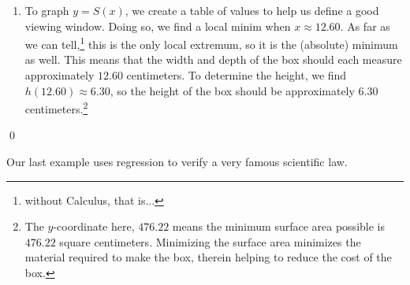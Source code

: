 \documentclass{ximera}
\begin{document}
\begin{example}
\begin{enumerate}
\item   To graph $y = S(x)$, we create a table of values to help us define a good viewing window.  Doing so, we find a local minim when $x \approx 12.60$.  As far as we can tell,\footnote{without Calculus, that is...} this is the only local extremum, so it is the (absolute) minimum as well. This means that the width and depth of the box should each measure approximately $12.60$ centimeters.  To determine the height, we find $h(12.60) \approx 6.30$, so the height of the box should be approximately $6.30$ centimeters.\footnote{The $y$-coordinate here, $476.22$ means the minimum surface area possible is $476.22$ square centimeters.  Minimizing the surface area minimizes the material required to make the box, therein helping to reduce the cost of the box.}

\begin{center}
\end{center}

\end{enumerate}
\qed

\end{example}

Our last example uses regression to verify a very famous scientific law.
\end{document}
